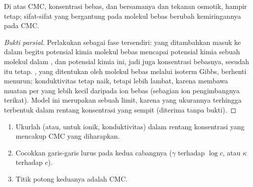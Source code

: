 \begin{proposition}\label{prop:b3:colloids:cmc-break}
Di atas CMC, konsentrasi  bebas, dan bersamanya 
dan tekanan osmotik, hampir tetap; sifat-sifat yang bergantung pada
molekul bebas berubah kemiringannya pada CMC.
\end{proposition}

\begin{proof}[Bukti parsial]
Perlakukan  sebagai fase tersendiri:  yang ditambahkan masuk ke dalam  begitu
potensial kimia molekul bebas mencapai potensial kimia sebuah molekul dalam
, dan potensial kimia ini, jadi juga konsentrasi bebasnya, sesudah itu tetap.
, yang ditentukan oleh molekul bebas melalui isoterm
Gibbs, berhenti menurun; konduktivitas tetap naik, tetapi lebih lambat, karena
 membawa muatan per  yang lebih kecil daripada ion bebas (sebagian
ion pengimbangnya terikat). Model ini merupakan sebuah limit, karena  yang
ukurannya terhingga terbentuk dalam rentang konsentrasi yang sempit (diterima
tanpa bukti).
\end{proof}

\begin{method}\label{met:b3:colloids:cmc}
\begin{enumerate}
  \item Ukurlah  (atau, untuk  ionik,
        konduktivitas) dalam rentang konsentrasi yang mencakup CMC yang
        diharapkan.
  \item Cocokkan garis-garis lurus pada kedua cabangnya ($\gamma$ terhadap $\log c$, atau $\kappa$ terhadap $c$).
  \item Titik potong keduanya adalah CMC.
\end{enumerate}
\end{method}

